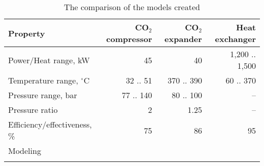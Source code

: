 \begin{table}
\label{tab:DiscussionComparison}
\caption{The comparison of the models created}
\begin{center}
\begin{tabulary}{0.9\textwidth}{LRRR}
\toprule
Property    	                &	CO$_2$ compressor   & CO$_2$	expander    & Heat exchanger    \\
\midrule
Power/Heat range, kW            &       45              &       40              &   1,200 .. 1,500  \\
Temperature range, $^\circ$C    &    32 .. 51           &      370 .. 390       &   60 .. 370       \\
Pressure range, bar             &   77 .. 140           &     80 .. 100         &      --           \\
Pressure ratio                  &   2                   &        1.25           &      --           \\
Efficiency/effectiveness, \%    &      75               &         86            &       95          \\
Modeling                        &                       &                       &                   \\
                                &                       &                       &                   \\
\bottomrule
\end{tabulary}
\end{center}
\end{table}